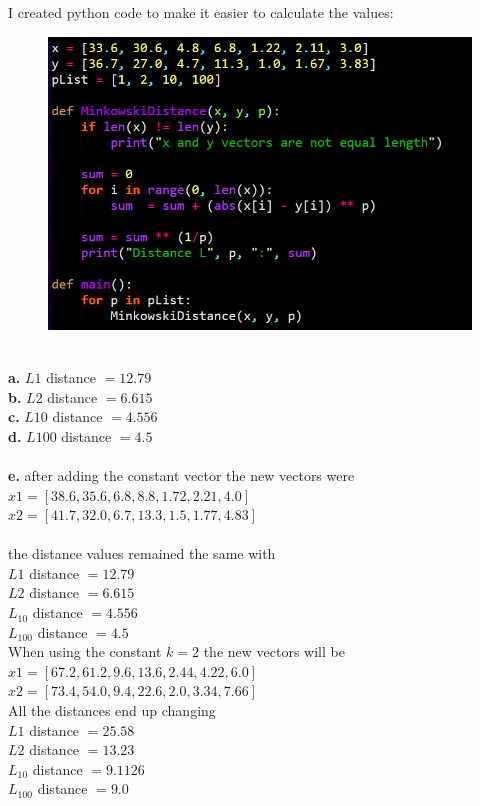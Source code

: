 \documentclass[letter]{article}
\theoremstyle{case}
\begin{document}
I created python code to make it easier to calculate the values:
\begin{figure}[h!]
	\includegraphics[scale=0.4]{codeSnippet.png}
\end{figure} \\
\textbf{a. } $L1$ distance $=12.79$ \\
\textbf{b. } $L2$ distance $=6.615$ \\
\textbf{c. } $L10$ distance $=4.556$ \\
\textbf{d. } $L100$ distance $=4.5$ \\\\
\textbf{e. } after adding the constant vector the new vectors were\\
$x1 = [38.6, 35.6, 6.8, 8.8, 1.72, 2.21, 4.0]$ \\
$x2 = [41.7, 32.0, 6.7, 13.3, 1.5, 1.77, 4.83]$ \\\\
the distance values remained the same with \\
$L1$ distance $=12.79$ \\
$L2$ distance $=6.615$ \\
$L_{10}$ distance $=4.556$ \\
$L_{100}$ distance $=4.5$ \\
\newpage
When using the constant $k=2$ the new vectors will be\\
$x1 = [67.2, 61.2, 9.6, 13.6, 2.44, 4.22, 6.0]$ \\
$x2 = [73.4, 54.0, 9.4, 22.6, 2.0, 3.34, 7.66]$ \\
All the distances end up changing \\
$L1$ distance $=25.58$ \\
$L2$ distance $=13.23$ \\
$L_{10}$ distance $=9.1126$ \\
$L_{100}$ distance $=9.0$ \\ \\
\end{document}
